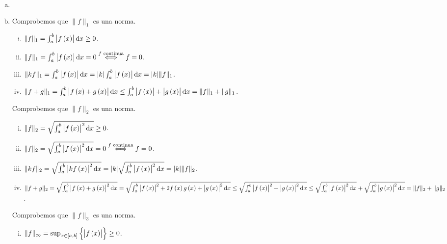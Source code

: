 \begin{eje}
    \begin{enumerate}[(a)]
        \item[]
        \item Comprobemos que $\| f \|_1$ es una norma.
            \begin{enumerate}[i)]
                \item $\| f \|_1 =  \int_a^b \left| f \lp x \rp \right| \dif x \geq 0$.
                \item $\| f \|_1 =  \int_a^b \left| f \lp x \rp \right| \dif x = 0 \stackrel{f \text{ continua}}{\iff} f = 0$.
                \item $\| kf \|_1 =  \int_a^b \left| f \lp x \rp \right| \dif x = | k | \int_a^b \left| f \lp x \rp \right| \dif x = | k | \|f \|_1$.
                \item $\| f+g \|_1 =  \int_a^b \left| f \lp x \rp +g \lp x \rp \right| \dif x \leq \int_a^b \left| f\lp x \rp \right| + \left| g \lp x \rp \right| \dif x = \| f \| _1 + \| g \|_ 1 $.
            \end{enumerate}
            Comprobemos que $\| f \|_2$ es una norma.
            \begin{enumerate}[i)]
                \item $\| f \|_2 =  \sqrt{\int_a^b \left| f \lp x \rp \right|^2 \dif x } \geq 0$.
                \item $\| f \|_2 =  \sqrt{\int_a^b \left| f \lp x \rp \right|^2 \dif x} = 0 \stackrel{f \text{ continua}}{\iff} f = 0$.
                \item $\| kf \|_2 =  \sqrt{\int_a^b \left| kf \lp x \rp \right|^2 \dif x} = | k | \sqrt{\int_a^b \left| f \lp x \rp \right|^2 \dif x } = | k | \|f \|_2 $.
                \item $\| f+g \|_2 =  \sqrt{\int_a^b \left| f \lp x \rp +g \lp x \rp \right|^2 \dif x} = \sqrt{\int_a^b \left| f \lp x \rp \right|^2+2f \lp x \rp g \lp x \rp + \left| g \lp x \rp \right|^2 \dif x} \leq \sqrt{\int_a^b \left| f \lp x \rp \right|^2 + \left| g \lp x \rp \right|^2 \dif x} \leq \sqrt{\int_a^b \left| f \lp x \rp \right|^2 \dif x} + \sqrt{\int_a^b \left| g \lp x \rp \right|^2 \dif x} = \| f \| _2 + \| g \|_2 $.
            \end{enumerate}
            Comprobemos que $\| f \|_3$ es una norma.
            \begin{enumerate}[i)]
                \item $\| f \|_{\infty} = \sup_{x\in \left[ a, b \right]} \left\{ \left| f \left( x \right) \right| \right\} \geq 0$.

\end{enumerate}
\end{enumerate}
\end{eje}
